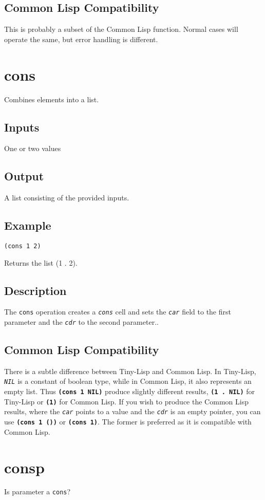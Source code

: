 \documentclass[10pt, openany]{book}
\newcommand{\operation}[1]{\textbf{\texttt{#1}}}
\newcommand{\function}[1]{\texttt{#1}}
\newcommand{\constant}[1]{\emph{\texttt{#1}}}
\newcommand{\datatype}[1]{\texttt{#1}}
\newcommand{\tl}{Tiny-Lisp}
\newcommand{\cl}{Common Lisp}
\begin{document}
\subsection{Common Lisp Compatibility}
This is probably a subset of the \cl{} function.  Normal cases will operate the same, but error handling is different.

\section{cons}
Combines elements into a list.
\subsection{Inputs}
One or two values
\subsection{Output}
A list consisting of the provided inputs.
\subsection{Example}
\begin{lstlisting}
(cons 1 2)
\end{lstlisting}
Returns the list (1 . 2).
\subsection{Description}
The \function{cons} operation creates a \constant{cons} cell and sets the \constant{car} field to the first parameter and the \constant{cdr} to the second parameter..
\subsection{Common Lisp Compatibility}
There is a subtle difference between \tl{} and \cl.  In \tl, \constant{NIL} is a constant of boolean type, while in \cl, it also represents an empty list.  Thus \operation{(cons 1 NIL)} produce slightly different results, \operation{(1 . NIL)} for \tl{} or \operation{(1)} for \cl.  If you wish to produce the \cl{} results, where the \constant{car} points to a value and the \constant{cdr} is an empty pointer, you can use \operation{(cons 1 ())} or \operation{(cons 1)}.  The former is preferred as it is compatible with \cl.

\section{consp}
Is parameter a \datatype{cons}?
\end{document}
